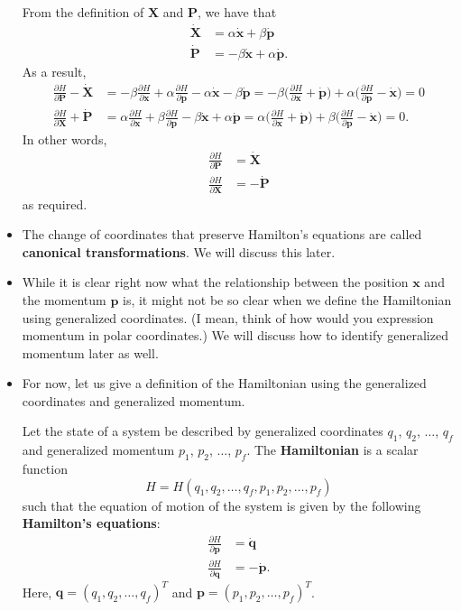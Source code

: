 \documentclass[10pt]{article}
\newcommand{\ve}[1]{\mathbf{#1}}
\begin{document}
\begin{itemize}
  	From the definition of $\ve{X}$ and $\ve{P}$, we have that
  	\begin{align*}
  		\dot{\ve{X}} &= \alpha \dot{\ve{x}} + \beta \dot{\ve{p}} \\
  		\dot{\ve{P}} &= -\beta \dot{\ve{x}} + \alpha \dot{\ve{p}}.
  	\end{align*}
  	As a result,
  	\begin{align*}
  		\frac{\partial H}{\partial \ve{P}} - \dot{\ve{X}}
  		&= -\beta \frac{\partial H}{\partial \ve{x}} + \alpha \frac{\partial H}{\partial \ve{p}} -\alpha \dot{\ve{x}} - \beta \dot{\ve{p}}
  		= -\beta\bigg( \frac{\partial H}{\partial \ve{x}} + \dot{\ve{p}} \bigg) + \alpha \bigg( \frac{\partial H}{\partial \ve{p}} - \dot{\ve{x}} \bigg) = 0 \\
  		\frac{\partial H}{\partial \ve{X}} + \dot{\ve{P}}
  		&= \alpha \frac{\partial H}{\partial \ve{x}}  + \beta \frac{\partial H}{\partial \ve{p}} -\beta \dot{\ve{x}} + \alpha \dot{\ve{p}}
  		= \alpha \bigg( \frac{\partial H}{\partial \ve{x}} + \dot{\ve{p}} \bigg) + \beta \bigg( \frac{\partial H}{\partial \ve{p}} - \dot{\ve{x}} \bigg) = 0.
  	\end{align*}
  	In other words,
  	\begin{align*}
  		\frac{\partial H}{\partial \ve{P}} &= \dot{\ve{X}} \\
  		\frac{\partial H}{\partial \ve{X}} &= -\dot{\ve{P}}
  	\end{align*}
  	as required.

  	\item The change of coordinates that preserve Hamilton's equations are called {\bf canonical transformations}. We will discuss this later.

  	\item While it is clear right now what the relationship between the position $\ve{x}$ and the momentum $\ve{p}$ is, it might not be so clear when we define the Hamiltonian using generalized coordinates. (I mean, think of how would you expression momentum in polar coordinates.) We will discuss how to identify generalized momentum later as well.

  	\item For now, let us give a definition of the Hamiltonian using the generalized coordinates and generalized momentum.

  	Let the state of a system be described by generalized coordinates $q_1$, $q_2$, $\dotsc$, $q_f$ and generalized momentum $p_1$, $p_2$, $\dotsc$, $p_f$. The {\bf Hamiltonian} is a scalar function
  	$$H = H(q_1, q_2, \dotsc, q_f, p_1, p_2, \dotsc, p_f)$$ such that the equation of motion of the system is given by the following {\bf Hamilton's equations}:
  	\begin{align*}
  		\frac{\partial H}{\partial \ve{p}} &= \dot{\ve{q}} \\
  		\frac{\partial H}{\partial \ve{q}} &= -\dot{\ve{p}}.
  	\end{align*}
  	Here, $\ve{q} = (q_1, q_2, \dotsc, q_f)^T$ and $\ve{p} = (p_1, p_2, \dotsc, p_f)^T$.
  \end{itemize}
  
\end{document}
